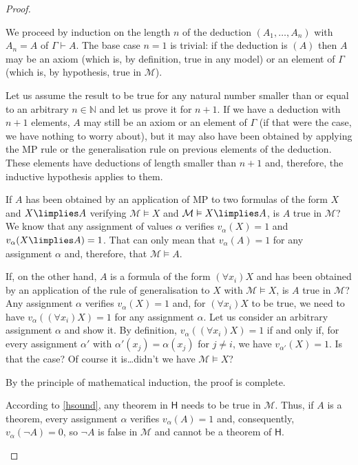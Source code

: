 \begin{proof}
\begin{parlist}
\item We proceed by induction on the length $n$ of the deduction $(A_1,\ldots,A_n)$ with $A_n = A$ of $\Gamma\vdash A$.
The base case $n=1$ is trivial: if the deduction is $(A)$ then $A$ may be an axiom (which is, by definition, true in any model) or an element of $\Gamma$ (which is, by hypothesis, true in $\mathcal{M}$).

Let us assume the result to be true for any natural number smaller than or equal to an arbitrary $n\in \mathbb{N}$ and let us prove it for $n+1$.
If we have a deduction with $n+1$ elements, $A$ may still be an axiom or an element of $\Gamma$ (if that were the case, we have nothing to worry about), but it may also have been obtained by applying the MP rule or the generalisation rule on previous elements of the deduction.
These elements have deductions of length smaller than $n+1$ and, therefore, the inductive hypothesis applies to them.

If $A$ has been obtained by an application of MP to two formulas of the form $X$ and $X\limplies A$ verifying $\mathcal{M} \vDash X$ and $\mathcal{M} \vDash X\limplies A$, is $A$ true in $\mathcal{M}$? We know that any assignment of values $\alpha$ verifies $v_\alpha(X) = 1$ and $v_\alpha(X\limplies A) = 1$. That can only mean that $v_\alpha(A) = 1$ for any assignment $\alpha$ and, therefore, that $\mathcal{M}\vDash A$.

If, on the other hand, $A$ is a formula of the form $(\forall x_i) X$ and has been obtained by an application of the rule of generalisation to $X$ with $\mathcal{M}\vDash X$, is $A$ true in $\mathcal{M}$?
Any assignment $\alpha$ verifies $v_\alpha(X) = 1$ and, for $(\forall x_i) X$ to be true, we need to have $v_\alpha( (\forall x_i) X) = 1$ for any assignment $\alpha$.
Let us consider an arbitrary assignment $\alpha$ and show it.
By definition, $v_\alpha( (\forall x_i) X ) = 1$ if and only if, for every assignment $\alpha'$ with $\alpha'(x_j) = \alpha(x_j)$ for $j \neq i$, we have $v_{\alpha'}(X) = 1$. Is that the case? Of course it is\ldots didn't we have $\mathcal{M}\vDash X$?

By the principle of mathematical induction, the proof is complete.

\item According to \ref{hsound}, any theorem in $\mathsf{H}$ needs to be true in $\mathcal{M}$. Thus, if $A$ is a theorem, every assignment $\alpha$ verifies $v_\alpha(A) = 1$ and, consequently, $v_\alpha(\lnot A) = 0$, so $\lnot A$ is false in $\mathcal{M}$ and cannot be a theorem of $\mathsf{H}$.


\end{parlist}
\end{proof}
